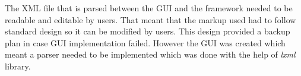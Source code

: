 The XML file that is parsed between the GUI and the framework needed to be readable and editable by users. That meant that the
markup used had to follow standard design so it can be modified by users.
This design provided a backup plan in case GUI implementation failed. However the GUI was created
which meant a parser needed to be implemented which was done with the help of \textit{lxml} library.